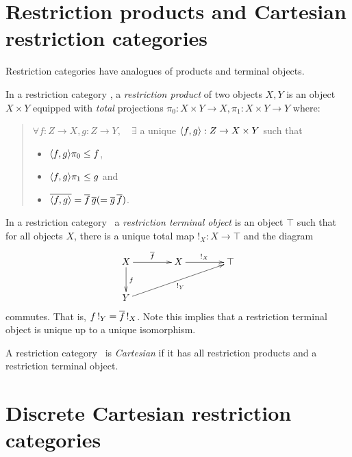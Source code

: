 \section{Restriction products and Cartesian restriction categories} %
\label{sub:restriction_products_and_cartesian_restriction_categories}


Restriction categories have analogues of products and terminal objects.

\begin{definition}\label{def:restriction_product}
  In a restriction category \X, a \emph{restriction product}  of two objects $X, Y$ is an
  object $X\times Y$ equipped with \emph{total} projections
  $\pi_0:X\times Y\to X, \pi_1:X\times Y\to Y $ where:
  \begin{quote}
    $\forall f:Z\to X, g: Z\to Y, \quad \exists$ a unique $\langle f,g\rangle:Z \to X\times Y$ such that
    \begin{itemize}
      \item $\langle f,g\rangle \pi_0 \le f$,
      \item $\langle f,g\rangle \pi_1 \le g$ and
      \item $\overline{\langle f,g\rangle} = \overline{f}\, \overline{g} ( = \overline{g}\, \overline{f})$.
    \end{itemize}
  \end{quote}
\end{definition}

\begin{definition}\label{def:restriction_terminal_object}
  In a restriction category \X\, a \emph{restriction terminal object}
  is an object $\top$ such that for all objects $X$, there is a
  unique total map $!_X : X \to \top$ and the diagram
  \[
    \xymatrix @C=40pt @R=25pt{
      X \ar[r]^{\restr{f}} \ar[d]^{f} & X \ar[r]^{!_X}  &\top  \\
      Y \ar[urr]_{!_Y}
    }
  \]
  commutes. That is,  $f\, !_Y = \overline{f}\, !_X$. Note this implies
  that a restriction terminal object is unique up to a unique isomorphism.
\end{definition}

\begin{definition}\label{def:cartesian_restriction_category}
  A restriction category \X\ is \emph{Cartesian} if it has all restriction products
  and a restriction terminal object.
\end{definition}

\section{Discrete Cartesian restriction categories}\label{sub:discrete_restriction_categories}

